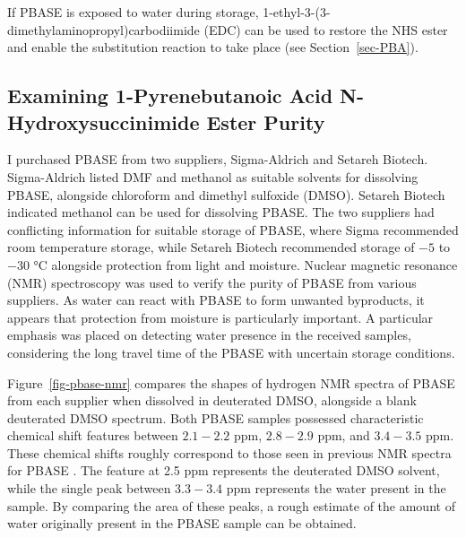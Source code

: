 \documentclass[
  a4paper,
]{scrbook}
\begin{document}
If PBASE is exposed to water during storage,
1-ethyl-3-(3-dimethylaminopropyl)carbodiimide (EDC) can be used to
restore the NHS ester and enable the substitution reaction to take place
(see Section~\ref{sec-PBA}).

\hypertarget{sec-PBASE-purity}{%
\subsection{Examining 1-Pyrenebutanoic Acid N-Hydroxysuccinimide Ester
Purity}\label{sec-PBASE-purity}}

I purchased PBASE from two suppliers, Sigma-Aldrich and Setareh Biotech.
Sigma-Aldrich listed DMF and methanol as suitable solvents for
dissolving PBASE, alongside chloroform and dimethyl sulfoxide (DMSO).
Setareh Biotech indicated methanol can be used for dissolving PBASE. The
two suppliers had conflicting information for suitable storage of PBASE,
where Sigma recommended room temperature storage, while Setareh Biotech
recommended storage of \(-5\) to \(-30\) °C alongside protection from
light and moisture. Nuclear magnetic resonance (NMR) spectroscopy was
used to verify the purity of PBASE from various suppliers. As water can
react with PBASE to form unwanted byproducts, it appears that protection
from moisture is particularly important. A particular emphasis was
placed on detecting water presence in the received samples, considering
the long travel time of the PBASE with uncertain storage conditions.

Figure~\ref{fig-pbase-nmr} compares the shapes of hydrogen NMR spectra
of PBASE from each supplier when dissolved in deuterated DMSO, alongside
a blank deuterated DMSO spectrum. Both PBASE samples possessed
characteristic chemical shift features between \(2.1-2.2\) ppm,
\(2.8-2.9\) ppm, and \(3.4-3.5\) ppm. These chemical shifts roughly
correspond to those seen in previous NMR spectra for PBASE
\autocite{NMR2}. The feature at 2.5 ppm represents the deuterated DMSO
solvent, while the single peak between \(3.3-3.4\) ppm represents the
water present in the sample. By comparing the area of these peaks, a
rough estimate of the amount of water originally present in the PBASE
sample can be obtained.
\end{document}
